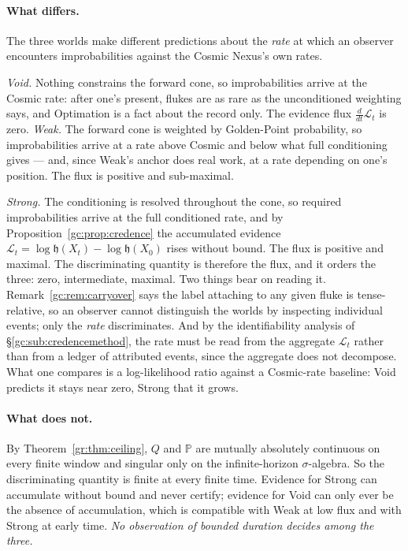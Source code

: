 \documentclass[11pt]{article}
\numberwithin{equation}{section}
\theoremstyle{plain}
\theoremstyle{definition}
\theoremstyle{remark}
\newcommand{\PP}{\mathbb{P}}
\newcommand{\Lc}{\mathcal{L}}
\newcommand{\hm}{\mathfrak{h}}
\begin{document}
\paragraph{What differs.} The three worlds make different predictions
about the \emph{rate} at which an observer encounters improbabilities
against the Cosmic Nexus's own rates.

\emph{Void.} Nothing constrains the forward cone, so improbabilities
arrive at the Cosmic rate: after one's present, flukes are as rare as the
unconditioned weighting says, and Optimation is a fact about the record
only. The evidence flux $\tfrac{d}{dt}\Lc_t$ is zero. \emph{Weak.} The forward cone is weighted by Golden-Point probability, so
improbabilities arrive at a rate above Cosmic and below what full
conditioning gives --- and, since Weak's anchor does real work, at a rate
depending on one's position. The flux is positive and sub-maximal.

\emph{Strong.} The conditioning is resolved throughout the cone, so
required improbabilities arrive at the full conditioned rate, and by
Proposition~\ref{gc:prop:credence} the accumulated evidence
$\Lc_t=\log\hm(X_t)-\log\hm(X_0)$ rises without bound. The flux is
positive and maximal. The discriminating quantity is therefore the flux, and it orders the
three: zero, intermediate, maximal. Two things bear on reading it.
Remark~\ref{gc:rem:carryover} says the label attaching to any given fluke
is tense-relative, so an observer cannot distinguish the worlds by
inspecting individual events; only the \emph{rate} discriminates. And by
the identifiability analysis of \S\ref{gc:sub:credencemethod}, the rate
must be read from the aggregate $\Lc_t$ rather than from a ledger of
attributed events, since the aggregate does not decompose. What one
compares is a log-likelihood ratio against a Cosmic-rate baseline: Void
predicts it stays near zero, Strong that it grows.

\paragraph{What does not.} By Theorem~\ref{gr:thm:ceiling}, $Q$ and $\PP$
are mutually absolutely continuous on every finite window and singular
only on the infinite-horizon $\sigma$-algebra. So the discriminating
quantity is finite at every finite time. Evidence for Strong can
accumulate without bound and never certify; evidence for Void can only
ever be the absence of accumulation, which is compatible with Weak at low
flux and with Strong at early time. \emph{No observation of bounded
duration decides among the three.}
\end{document}
